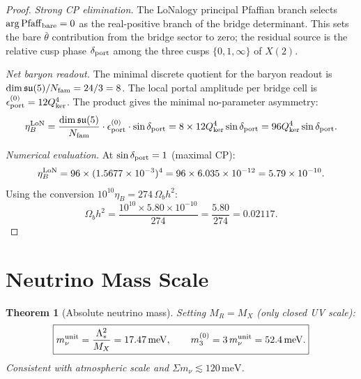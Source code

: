 \documentclass[12pt]{article}
\theoremstyle{plain}
\newtheorem{theorem}{Theorem}[section]
\theoremstyle{definition}
\numberwithin{equation}{section}
\newcommand{\kker}{\mathrm{ker}}
\begin{document}
\begin{proof}
\emph{Strong CP elimination.}
The LoNalogy principal Pfaffian branch selects $\arg\mathrm{Pfaff}_{\rm bare}=0$ as the real-positive branch of the bridge determinant.  This sets the bare $\bar\theta$ contribution from the bridge sector to zero; the residual source is the relative cusp phase $\delta_{\rm port}$ among the three cusps $\{0,1,\infty\}$ of $X(2)$.

\emph{Net baryon readout.}
The minimal discrete quotient for the baryon readout is $\dim\mathfrak{su}(5)/N_{\rm fam}=24/3=8$.
The local portal amplitude per bridge cell is $\epsilon_{\rm port}^{(0)}=12Q_{\kker}^4$.
The product gives the minimal no-parameter asymmetry:
\[
\eta_B^{\rm LoN}=\frac{\dim\mathfrak{su}(5)}{N_{\rm fam}}\cdot\epsilon_{\rm port}^{(0)}\cdot\sin\delta_{\rm port}
=8\times12Q_{\kker}^4\sin\delta_{\rm port}=96Q_{\kker}^4\sin\delta_{\rm port}.
\]

\emph{Numerical evaluation.}
At $\sin\delta_{\rm port}=1$ (maximal CP):
\[
\eta_B^{\rm LoN}=96\times(1.5677\times10^{-3})^4=96\times6.035\times10^{-12}=5.79\times10^{-10}.
\]
Using the conversion $10^{10}\eta_B=274\,\Omega_b h^2$:
\[
\Omega_b h^2=\frac{10^{10}\times5.80\times10^{-10}}{274}=\frac{5.80}{274}=0.02117.
\]
\end{proof}

\section{Neutrino Mass Scale}\label{sec:neutrino}

\begin{theorem}[Absolute neutrino mass]\label{thm:numass}
Setting $M_R=M_X$ (only closed UV scale):
\[
\boxed{m_\nu^{\rm unit}=\frac{\Lambda_*^2}{M_X}=17.47\,\mathrm{meV},\qquad m_3^{(0)}=3\,m_\nu^{\rm unit}=52.4\,\mathrm{meV}.}
\]
Consistent with atmospheric scale and $\Sigma m_\nu\lesssim120\,\mathrm{meV}$.
\end{theorem}
\end{document}
